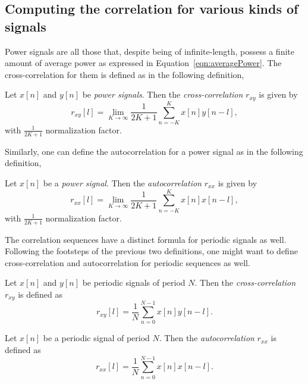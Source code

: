 \documentclass[\documentfontsize, twocolumn]{\classname}
\begin{document}
\subsection{Computing the correlation for various kinds of signals}

Power signals are all those that, despite being of infinite-length, possess a finite amount of average power as expressed in Equation~\ref{eqn:averagePower}. The cross-correlation for them is defined as in the following definition,
\begin{defin}
    Let $x[n]$ and $y[n]$ be \emph{power signals}. Then the \emph{cross-correlation} $r_{xy}$ is given by
    \begin{equation}\label{eqn:crossCorrelationPowerSignals}
        r_{xy}[l] = \lim_{K\rightarrow \infty} \frac 1 {2K+1} \sum_{n=-K}^K x[n]y[n-l],
    \end{equation}
    with $\frac 1 {2K+1}$ normalization factor.
\end{defin}

Similarly, one can define the autocorrelation for a power signal as in the following definition,
\begin{defin}
    Let $x[n]$ be a \emph{power signal}. Then the \emph{autocorrelation} $r_{xx}$ is given by
    \begin{equation}\label{eqn:crossCorrelationPowerSignals}
        r_{xx}[l] = \lim_{K\rightarrow \infty} \frac 1 {2K+1} \sum_{n=-K}^K x[n]x[n-l],
    \end{equation}
    with $\frac 1 {2K+1}$ normalization factor.
\end{defin}

The correlation sequences have a distinct formula for periodic signals as well. Following the footsteps of the previous two definitions, one might want to define cross-correlation and autocorrelation for periodic sequences as well.

\begin{defin}
    Let $x[n]$ and $y[n]$ be periodic signals of period $N$. Then the \emph{cross-correlation} $r_{xy}$ is defined as
    \begin{equation}\label{eqn:crossCorrelationPeriodicSignals}
        r_{xy}[l] = \frac 1 N \sum_{n=0}^{N-1} x[n]y[n-l].
    \end{equation}
\end{defin}

\begin{defin}
    Let $x[n]$ be a periodic signal of period $N$. Then the \emph{autocorrelation} $r_{xx}$ is defined as
    \begin{equation}\label{eqn:crossCorrelationPeriodicSignals}
        r_{xx}[l] = \frac 1 N \sum_{n=0}^{N-1} x[n]x[n-l].
    \end{equation}
\end{defin}
\end{document}

